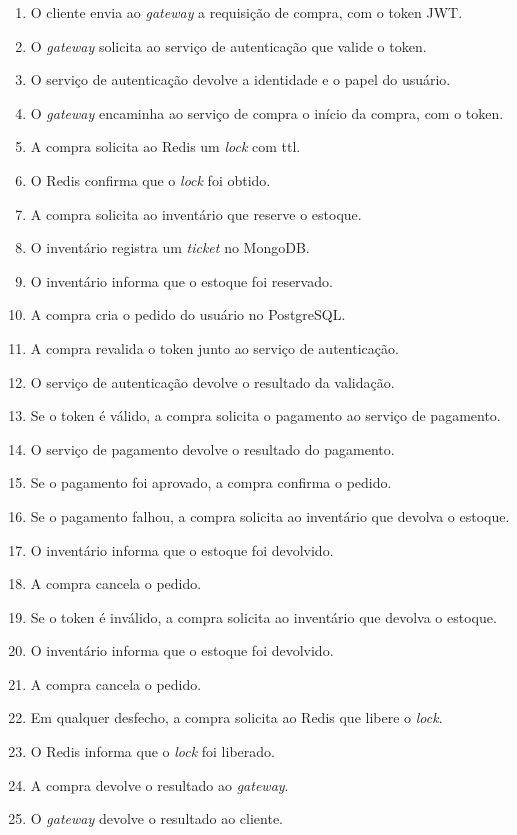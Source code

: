 \begin{enumerate}
  \item O cliente envia ao \textit{gateway} a requisição de compra, com o token JWT.
  \item O \textit{gateway} solicita ao serviço de autenticação que valide o token.
  \item O serviço de autenticação devolve a identidade e o papel do usuário.
  \item O \textit{gateway} encaminha ao serviço de compra o início da compra, com o token.
  \item A compra solicita ao Redis um \textit{lock} com \gls{ttl}.
  \item O Redis confirma que o \textit{lock} foi obtido.
  \item A compra solicita ao inventário que reserve o estoque.
  \item O inventário registra um \textit{ticket} no MongoDB.
  \item O inventário informa que o estoque foi reservado.
  \item A compra cria o pedido do usuário no PostgreSQL.
  \item A compra revalida o token junto ao serviço de autenticação.
  \item O serviço de autenticação devolve o resultado da validação.
  \item Se o token é válido, a compra solicita o pagamento ao serviço de pagamento.
  \item O serviço de pagamento devolve o resultado do pagamento.
  \item Se o pagamento foi aprovado, a compra confirma o pedido.
  \item Se o pagamento falhou, a compra solicita ao inventário que devolva o estoque.
  \item O inventário informa que o estoque foi devolvido.
  \item A compra cancela o pedido.
  \item Se o token é inválido, a compra solicita ao inventário que devolva o estoque.
  \item O inventário informa que o estoque foi devolvido.
  \item A compra cancela o pedido.
  \item Em qualquer desfecho, a compra solicita ao Redis que libere o \textit{lock}.
  \item O Redis informa que o \textit{lock} foi liberado.
  \item A compra devolve o resultado ao \textit{gateway}.
  \item O \textit{gateway} devolve o resultado ao cliente.
\end{enumerate}

